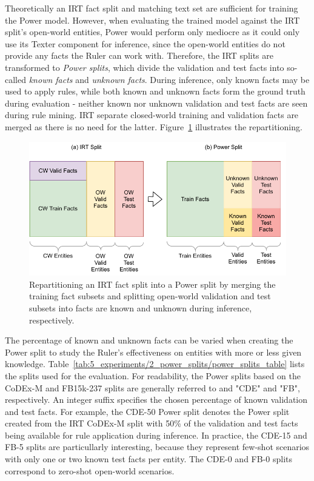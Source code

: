 Theoretically an IRT fact split and matching text set are sufficient for training the Power model. However, when evaluating the trained model against the IRT split's open-world entities, Power would perform only mediocre as it could only use its Texter component for inference, since the open-world entities do not provide any facts the Ruler can work with. Therefore, the IRT splits are transformed to \emph{Power splits}, which divide the validation and test facts into so-called \emph{known facts} and \emph{unknown facts}. During inference, only known facts may be used to apply rules, while both known and unknown facts form the ground truth during evaluation - neither known nor unknown validation and test facts are seen during rule mining. IRT separate closed-world training and validation facts are merged as there is no need for the latter. Figure~\ref{fig:5_experiments/2_power_splits/power_split} illustrates the repartitioning.

\begin{figure}[t]
    \centering
    \includegraphics[width=\textwidth]{5_experiments/2_power_splits/power_split}
    \caption{Repartitioning an IRT fact split into a Power split by merging the training fact subsets and splitting open-world validation and test subsets into facts are known and unknown during inference, respectively.}
    \label{fig:5_experiments/2_power_splits/power_split}
\end{figure}

The percentage of known and unknown facts can be varied when creating the Power split to study the Ruler's effectiveness on entities with more or less given knowledge. Table~\ref{tab:5_experiments/2_power_splits/power_splits_table} lists the splits used for the evaluation. For readability, the Power splits based on the CoDEx-M and FB15k-237 splits are generally referred to and "CDE" and "FB", respectively. An integer suffix specifies the chosen percentage of known validation and test facts. For example, the CDE-50 Power split denotes the Power split created from the IRT CoDEx-M split with 50\% of the validation and test facts being available for rule application during inference. In practice, the CDE-15 and FB-5 splits are particullarly interesting, because they represent few-shot scenarios with only one or two known test facts per entity. The CDE-0 and FB-0 splits correspond to zero-shot open-world scenarios.

